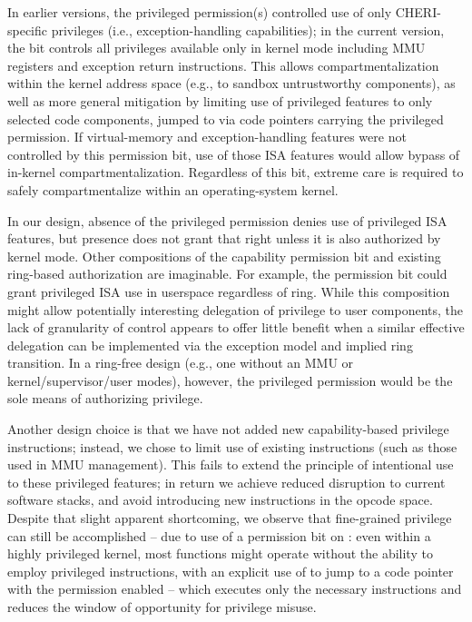 In earlier versions, the privileged permission(s) controlled use of only CHERI-specific
privileges (i.e., exception-handling capabilities); in the current version, the
bit controls all privileges available only in kernel mode including
MMU registers and exception return instructions.
This allows compartmentalization within the kernel address space (e.g., to
sandbox untrustworthy components), as well as more general mitigation by
limiting use of privileged features to only selected code components, jumped
to via code pointers carrying the privileged permission.
If virtual-memory and exception-handling features were not controlled by this
permission bit, use of those ISA features would allow bypass of in-kernel
compartmentalization.
Regardless of this bit, extreme care is required to safely compartmentalize
within an operating-system kernel.

In our design, absence of the privileged permission denies use of privileged
ISA features, but presence does not grant that right unless it is also
authorized by kernel mode.
Other compositions of the capability permission bit and existing
ring-based authorization are imaginable.
For example, the permission bit could grant privileged ISA use in userspace
regardless of ring.
While this composition might allow potentially interesting delegation of
privilege to user components, the lack of granularity of control appears to
offer little benefit when a similar effective delegation can be implemented
via the exception model and implied ring transition.
In a ring-free design (e.g., one without an MMU or kernel/supervisor/user
modes), however, the privileged permission would be the sole means of
authorizing privilege.

Another design choice is that we have not added new
capability-based privilege instructions; instead, we chose to limit use of
existing instructions (such as those used in MMU management).
This fails to extend the principle of intentional use to these privileged
features; in return we achieve reduced disruption to current software
stacks, and avoid introducing new instructions in the opcode space.
Despite that slight apparent shortcoming,
we observe that fine-grained privilege can still be accomplished --
due to use of a permission bit
on \PCC{}: even within a highly privileged
kernel, most functions might operate without the ability to employ privileged
instructions, with an explicit use of  to jump to a code
pointer with the \cappermASR{} permission enabled -- which
executes
only the necessary instructions and reduces the window of opportunity for
privilege misuse.

